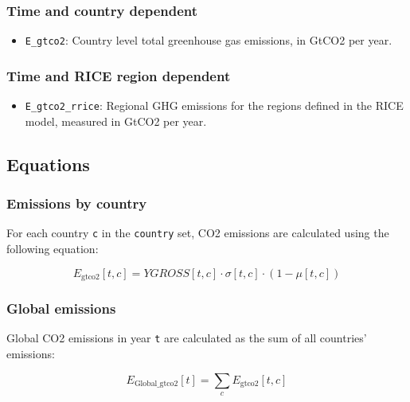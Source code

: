 \documentclass[
]{article}
\providecommand{\tightlist}{%
  \setlength{\itemsep}{0pt}\setlength{\parskip}{0pt}}
\begin{document}
\subsubsection{Time and country
dependent}\label{time-and-country-dependent-5}

\begin{itemize}
\tightlist
\item
  \texttt{E\_gtco2}: Country level total greenhouse gas emissions, in
  GtCO2 per year.
\end{itemize}

\subsubsection{Time and RICE region
dependent}\label{time-and-rice-region-dependent}

\begin{itemize}
\tightlist
\item
  \texttt{E\_gtco2\_rrice}: Regional GHG emissions for the regions
  defined in the RICE model, measured in GtCO2 per year.
\end{itemize}

\subsection{Equations}\label{equations-2}

\subsubsection{Emissions by country}\label{emissions-by-country}

For each country \texttt{c} in the \texttt{country} set, CO2 emissions
are calculated using the following equation:

\begin{equation}
 E_{\text{gtco2}}[t,c] = YGROSS[t,c] \cdot \sigma[t,c] \cdot (1-\mu[t,c]) 
\end{equation}


\subsubsection{Global emissions}\label{global-emissions}

Global CO2 emissions in year \texttt{t} are calculated as the sum of all
countries' emissions:

\begin{equation}
 E_{\text{Global\_gtco2}}[t] = \sum_{c} E_{\text{gtco2}}[t,c] 
\end{equation}
\end{document}
